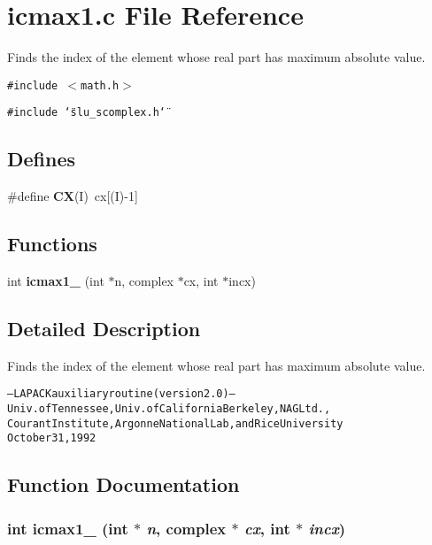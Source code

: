 \section{icmax1.c File Reference}
\label{icmax1_8c}
Finds the index of the element whose real part has maximum absolute value. 

{\tt \#include $<$math.h$>$}\par
{\tt \#include \char`\"{}slu\_\-scomplex.h\char`\"{}}\par
\subsection*{Defines}
\begin{CompactItemize}
\item 
\#define {\bf CX}(I)~cx[(I)-1]\label{icmax1_8c_5a76da95c549c41790389a76e12fdcb5}

\end{CompactItemize}
\subsection*{Functions}
\begin{CompactItemize}
\item 
int {\bf icmax1\_\-} (int $\ast$n, complex $\ast$cx, int $\ast$incx)
\end{CompactItemize}


\subsection{Detailed Description}
Finds the index of the element whose real part has maximum absolute value. 

\small\begin{alltt}
     -- LAPACK auxiliary routine (version 2.0) --   
     Univ. of Tennessee, Univ. of California Berkeley, NAG Ltd.,   
     Courant Institute, Argonne National Lab, and Rice University   
     October 31, 1992   
 \end{alltt}\normalsize 
 

\subsection{Function Documentation}
\subsubsection{\setlength{\rightskip}{0pt plus 5cm}int icmax1\_\- (int $\ast$ {\em n}, complex $\ast$ {\em cx}, int $\ast$ {\em incx})}\label{icmax1_8c_7315ad1456ee66d31a1171729e6c1c4f}



